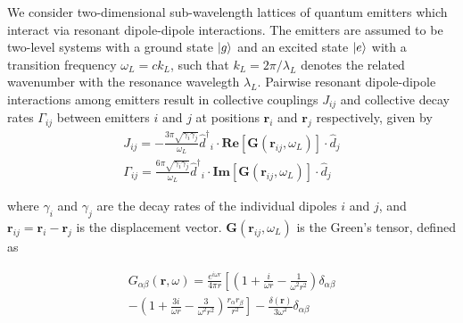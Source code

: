 \documentclass[aps,pra,superscriptaddress,twocolumn]{revtex4-1}
\newcommand{\rr}{\mathbf{r}}
\newcommand{\commentTP}[1]{\texttt{\color{green}[#1]}}
\begin{document}
We consider two-dimensional sub-wavelength lattices of quantum emitters which interact via resonant dipole-dipole interactions. The emitters are assumed to be two-level systems with a ground state $\ket{g}$ and an excited state $\ket{e}$ with a transition frequency $\omega_L = c k_L$, such that $k_L = 2\pi/\lambda_L$ denotes the related wavenumber with the resonance wavelegth $\lambda_L$. Pairwise resonant dipole-dipole interactions among emitters result in collective couplings $J_{ij}$ and collective decay rates $\Gamma_{ij}$ between emitters $i$ and $j$ at positions $\rr_i$ and $\rr_j$ respectively, given by 
\begin{subequations}
    \begin{align} J_{ij} = -\frac{3\pi \sqrt{\gamma_i \gamma_j}}{\omega_L} {\hat{d}^\dagger}_i \cdot \textbf{Re} [\textbf{G}(\textbf{r}_{ij}, \omega_L)] \cdot \hat{d}_j 
    \label{eqn:J} \\
    \Gamma_{ij} = \frac{6\pi \sqrt{\gamma_i \gamma_j}}{\omega_L} {\hat{d}^\dagger}_i \cdot \textbf{Im} [\textbf{G}(\textbf{r}_{ij},\omega_L)] \cdot \hat{d}_j 
    \label{eqn:Gamma} 
    \end{align}
\end{subequations}

where $\gamma_i$ and $\gamma_j$ are the decay rates of the individual dipoles $i$ and $j$, and $\rr_{ij} = \rr_i - \rr_j$ is the displacement vector. $\textbf{G}(\textbf{r}_{ij}, \omega_L)$ is the Green's tensor, defined as 

\begin{multline} 
    G_{\alpha\beta} (\textbf{r}, \omega) = \frac{e^{i\omega r}}{4\pi r} \left[ \left( 1 + \frac{i}{\omega r} - \frac{1}{\omega^2 r^2} \right) \delta_{\alpha\beta}
    \right. \\ \left. 
    - \left( 1 + \frac{3i}{\omega r} - \frac{3}{\omega^2 r^2} \right) \frac{r_\alpha r_\beta}{r^2} \right] - \frac{\delta(\textbf{r})}{3\omega^2} \delta_{\alpha\beta} 
    \label{eqn:Green}
\end{multline}
\end{document}
